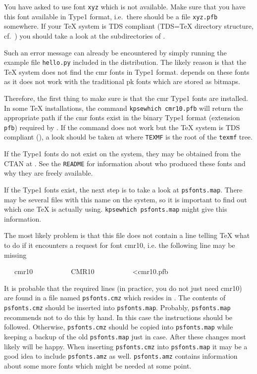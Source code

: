 \documentclass[11pt,DIV14]{scrartcl}
\begin{document}
{}
{\label{q:fontshape_undefined}
You have asked to use font \texttt{xyz} which is not available. Make sure that
you have this font available in Type1 format, i.e.\ there should be a 
file \texttt{xyz.pfb} somewhere. If your \TeX{} system is TDS compliant 
(TDS=\TeX{} directory structure, cf.\ ) 
you should take a look at the subdirectories of 
.
}

{}
{\label{q:no_cmr10}
Such an error message can already be encountered by simply running the example
file \texttt{hello.py} included in the \PyX{} distribution. The likely reason
is that the \TeX{} system does not find the cmr fonts in Type1 format.
\PyX{} depends on these fonts as it does not work with the traditional
pk fonts which are stored as bitmaps.

Therefore, the first thing to make sure is that the cmr Type1 fonts are
installed. In some \TeX{} installations, the command \texttt{kpsewhich 
cmr10.pfb} will return the appropriate path if the cmr fonts exist in the 
binary Type1 format (extension \texttt{pfb}) required by \PyX. If the command 
does not work but the TeX{} system is TDS compliant 
(), a look should be taken at 
 where \texttt{TEXMF} is the root of the 
\texttt{texmf} tree.

If the Type1 fonts do not exist on the system, they may be obtained from
the CTAN  at . See the 
\texttt{README} for information about who produced these fonts and why they
are freely available.

If the Type1 fonts exist, the next step is to take a look at 
\texttt{psfonts.map}. There may be several files with this name on the system, 
so it is important to find out which one TeX is actually using. 
\texttt{kpsewhich psfonts.map} might give this information.

The most likely problem is that this file does not contain a line telling TeX
what to do if it encounters a request for font cmr10, i.e. the following line 
may be missing
\begin{progcode}
~~~cmr10~~~~~~~~~~~CMR10~~~~~~~~~~~<cmr10.pfb
\end{progcode}
It is probable that the required lines (in practice, you do not just need 
cmr10) are found in a file named \texttt{psfonts.cmz} which resides in 
. The contents of \texttt{psfonts.cmz} should
be inserted into \texttt{psfonts.map}. Probably, \texttt{psfonts.map} recommends
not to do this by hand. In this case the instructions should be followed. 
Otherwise, \texttt{psfonts.cmz} should be copied into \texttt{psfonts.map}
while keeping a backup of the old \texttt{psfonts.map} just in case. After
these changes \PyX{} most likely will be happy. When inserting 
\texttt{psfonts.cmz} into \texttt{psfonts.map} it may be a good idea to 
include \texttt{psfonts.amz} as well. \texttt{psfonts.amz} contains information 
about some more fonts which might be needed at some point.

}
\end{document}
